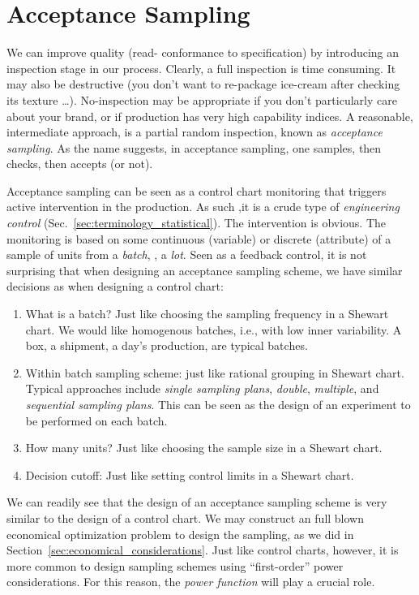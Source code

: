 \chapter{Acceptance Sampling}


We can improve quality (read- conformance to specification) by introducing an inspection stage in our process.
Clearly, a full inspection is time consuming. 
It may also be destructive (you don't want to re-package ice-cream after checking its texture \dots).
No-inspection may be appropriate if you don't particularly care about your brand, or if production has very high capability indices.
A reasonable, intermediate approach, is a partial random inspection, known as \emph{acceptance sampling}.
As the name suggests, in acceptance sampling, one samples, then checks, then accepts (or not).

Acceptance sampling can be seen as a control chart monitoring that triggers active intervention in the production. As such ,it is a crude type of \emph{engineering control} (Sec.~\ref{sec:terminology_statistical}).
The intervention is obvious. The monitoring is based on some continuous (variable) or discrete (attribute) of a sample of units from a \emph{batch}, \aka, a \emph{lot}.
Seen as a feedback control, it is not surprising that when designing an acceptance sampling scheme, we have similar decisions as when designing a control chart:
\begin{enumerate}
\item What is a batch? Just like choosing the sampling frequency in a Shewart chart. 
We would like homogenous batches, i.e., with low inner variability. A box, a shipment, a day's production, are typical batches. 
\item Within batch sampling scheme: just like rational grouping in Shewart chart. Typical approaches include \emph{single sampling plans}, \emph{double}, \emph{multiple}, and \emph{sequential sampling plans}.
This can be seen as the design of an experiment to be performed on each batch.
\item How many units? Just like choosing the sample size in a Shewart chart.
\item Decision cutoff: Just like setting control limits in a Shewart chart. 
\end{enumerate}
We can readily see that the design of an acceptance sampling scheme is very similar to the design of a control chart. 
We may construct an full blown economical optimization problem to design the sampling, as we did in Section~\ref{sec:economical_considerations}. Just like control charts, however, it is more common to design sampling schemes using ``first-order'' power considerations. 
For this reason, the \emph{power function} will play a crucial role.

